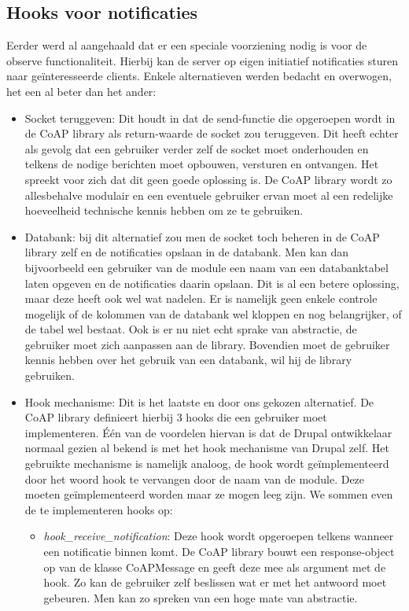 \subsection{Hooks voor notificaties} \label{observe_hooks}

Eerder werd al aangehaald dat er een speciale voorziening nodig is voor de observe functionaliteit. Hierbij kan de server op eigen initiatief notificaties sturen naar ge\"{i}nteresseerde clients. Enkele alternatieven werden bedacht en overwogen, het een al beter dan het ander:
\begin{itemize}
\item Socket teruggeven: Dit houdt in dat de send-functie die opgeroepen wordt in de CoAP library als return-waarde de socket zou teruggeven. Dit heeft echter als gevolg dat een gebruiker verder zelf de socket moet onderhouden en telkens de nodige berichten moet opbouwen, versturen en ontvangen. Het spreekt voor zich dat dit geen goede oplossing is. De CoAP library wordt zo allesbehalve modulair en een eventuele gebruiker ervan moet al een redelijke hoeveelheid technische kennis hebben om ze te gebruiken.
\item Databank: bij dit alternatief zou men de socket toch beheren in de CoAP library zelf en de notificaties opslaan in de databank. Men kan dan bijvoorbeeld een gebruiker van de module een naam van een databanktabel laten opgeven en de notificaties daarin opslaan. Dit is al een betere oplossing, maar deze heeft ook wel wat nadelen. Er is namelijk geen enkele controle mogelijk of de kolommen van de databank wel kloppen en nog belangrijker, of de tabel wel bestaat. Ook is er nu niet echt sprake van abstractie, de gebruiker moet zich aanpassen aan de library. Bovendien moet de gebruiker kennis hebben over het gebruik van een databank, wil hij de library gebruiken.
\item Hook mechanisme: Dit is het laatste en door ons gekozen alternatief. De CoAP library definieert hierbij 3 hooks die een gebruiker moet implementeren. \'{E}\'{e}n van de voordelen hiervan is dat de Drupal ontwikkelaar normaal gezien al bekend is met het hook mechanisme van Drupal zelf. Het gebruikte mechanisme is namelijk analoog, de hook wordt ge\"{i}mplementeerd door het woord hook te vervangen door de naam van de module. Deze moeten ge\"{i}mplementeerd worden maar ze mogen leeg zijn. We sommen even de te implementeren hooks op:
\begin{itemize}
\item \textit{hook\_receive\_notification}: Deze hook wordt opgeroepen telkens wanneer een notificatie binnen komt. De CoAP library bouwt een response-object op van de klasse CoAPMessage en geeft deze mee als argument met de hook. Zo kan de gebruiker zelf beslissen wat er met het antwoord moet gebeuren. Men kan zo spreken van een hoge mate van abstractie.

\end{itemize}
\end{itemize}

